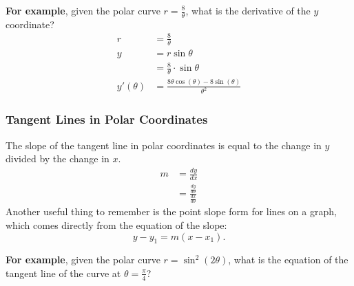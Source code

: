 \documentclass[12pt]{article}
\begin{document}
\noindent \textbf{For example}, given the polar curve $r=\frac{8}{\theta}$, what is the derivative of the $y$ coordinate?
\begin{align*}
	r          & = \frac{8}{\theta}                                        \\[6pt]
	y          & = r \sin \theta                                           \\
	& = \frac{8}{\theta} \cdot \sin \theta                      \\[10pt]
	y'(\theta) & = \frac{8 \theta \cos(\theta) - 8 \sin(\theta)}{\theta^2}
\end{align*}

\subsubsection{Tangent Lines in Polar Coordinates}
The slope of the tangent line in polar coordinates is equal to the change in $y$ divided by the change in $x$.
\begin{align*}
	m & = \frac{dy}{dx}                                 \\[6pt]
	& = \frac{\frac{dy}{d\theta}}{\frac{dx}{d\theta}}
\end{align*}
Another useful thing to remember is the point slope form for lines on a graph, which comes directly from the equation of the slope:
\[ y - y_1 = m(x - x_1). \]

\noindent \textbf{For example}, given the polar curve $r=\sin^2(2\theta)$, what is the equation of the tangent line of the curve at $\theta = \frac{\pi}{4}$?
\end{document}
